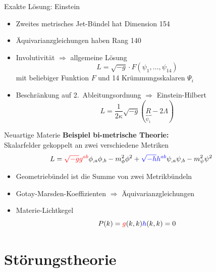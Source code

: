 \documentclass{beamer}
\begin{document}
    \begin{frame}{Exakte Lösung: Einstein}
        \begin{itemize}
            \item Zweites metrisches Jet-Bündel hat Dimension 154
            \item Äquivarianzgleichungen haben Rang 140
            \item Involutivität $\Rightarrow$ allgemeine Lösung
            \[ L = \sqrt{-g} \cdot F(\psi_1,\ldots,\psi_{14}) \]
            mit beliebiger Funktion $F$ und 14 Krümmungsskalaren $\Psi_i$
            \item Beschränkung auf 2.\ Ableitungsordnung $\Rightarrow$ \alert{Einstein-Hilbert}
            \[ L = \frac{1}{2\kappa}\sqrt{-g}(\underbrace{R}_{\psi_1} - 2\Lambda)\]
        \end{itemize}
    \end{frame}

    \begin{frame}{Neuartige Materie}
        \textbf{Beispiel bi-metrische Theorie:}\\ Skalarfelder gekoppelt an zwei verschiedene Metriken
            {\setlength{\belowdisplayskip}{-5pt}
        \[ L = {\color{red}\sqrt{-g} g^{ab}} \phi_{,a}\phi_{,b} - m_\phi^2 \phi^2 + {\color{blue}\sqrt{-h} h^{ab}} \psi_{,a}\psi_{,b} - m_\psi^2 \psi^2 \]}
        \begin{itemize}
            \item Geometriebündel ist die Summe von zwei Metrikbündeln
            \item Gotay-Marsden-Koeffizienten $\Rightarrow$ Äquivarianzgleichungen
            \item Materie-Lichtkegel
            \[ P(k) = {\color{red}g}(k,k) {\color{blue}h}(k,k) = 0 \]
        \end{itemize}
    \end{frame}


    \section{Störungstheorie}\label{sec:stoerungstheorie}
\end{document}
